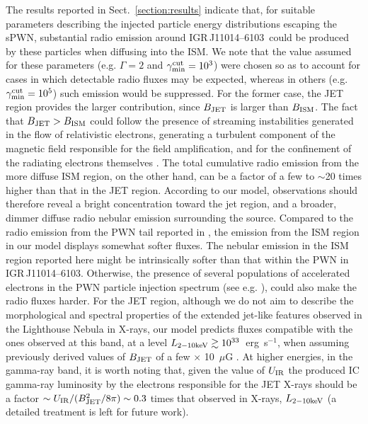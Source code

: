 \documentclass[letter]{aa}
\newcommand{\IGR}{IGR\,J11014--6103}
\newcommand{\igr}{IGR\,J11014--6103~}
\begin{document}
The results reported in Sect.~\ref{section:results} indicate that, for suitable parameters describing the injected particle energy distributions escaping the sPWN, substantial radio emission around \igr could be produced by these particles when diffusing into the ISM. We note that the value assumed for these parameters (e.g. $\Gamma = 2$ and $\gamma_{\rm min}^{ \rm cut} = 10^{3}$) were chosen so as to account for cases in which detectable radio fluxes may be expected, whereas in others (e.g. $\gamma_{\rm min}^{ \rm cut} = 10^{5}$) such emission would be suppressed. For the former case, the JET region provides the larger contribution, since $B_{\rm JET}$ is larger than $B_{\rm ISM}$. The fact that $B_{\rm JET}>B_{\rm ISM}$ could follow the presence of streaming instabilities generated in the flow of relativistic electrons, generating a turbulent component of the magnetic field responsible for the field amplification, and for the confinement of the radiating electrons themselves \citep{Bykov2017}. The total cumulative radio emission from the more diffuse ISM region, on the other hand, can be a factor of a few to $\sim$20 times higher than that in the JET region. According to our model, observations should therefore reveal a bright concentration toward the jet region, and a broader, dimmer diffuse radio nebular emission surrounding the source. Compared to the radio emission from the PWN tail reported in \citep{Pavan2014}, the emission from the ISM region in our model displays somewhat softer fluxes. The nebular emission in the ISM region reported here might be intrinsically softer than that within the PWN in \IGR. Otherwise, the presence of several populations of accelerated electrons in the PWN particle injection spectrum (see e.g. \citealp{Atoyan1996}), could also make the radio fluxes harder. For the JET region, although we do not aim to describe the morphological and spectral properties of the extended jet-like features observed in the Lighthouse Nebula in X-rays, our model predicts fluxes compatible with the ones observed at this band, at a level $L_{\rm 2-10keV}\gtrsim 10^{33}$~erg~s$^{-1}$, when assuming previously derived values of $B_{\rm JET}$ of a few $\times$ 10~$\mu$G \citep{Pavan2014}. At higher energies, in the gamma-ray band, it is worth noting that, given the value of $U_{\rm IR}$ the produced IC gamma-ray luminosity by the electrons responsible for the JET X-rays should be a factor $\sim U_{\rm IR}/(B_{\rm JET}^{2}/8\pi) \sim 0.3$ times that observed in X-rays, $L_{\rm 2-10keV}$ (a detailed treatment is left for future work).
\end{document}
